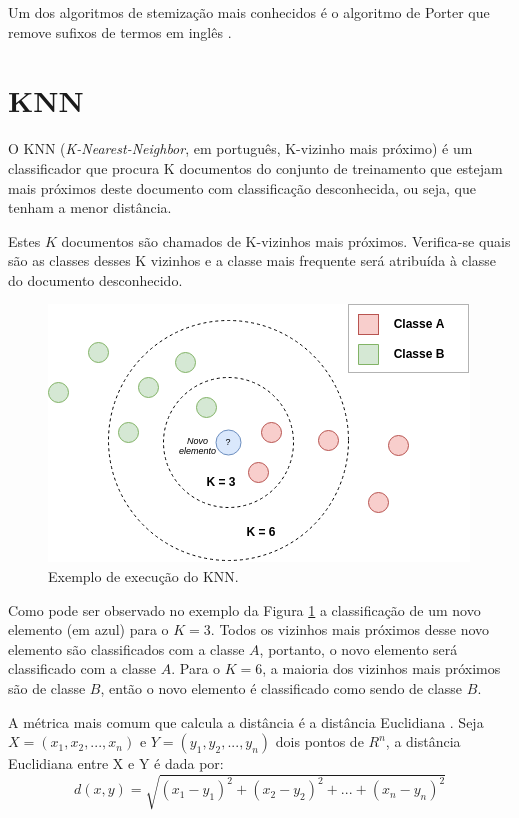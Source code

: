 Um dos algoritmos de stemização mais conhecidos é o algoritmo de Porter que remove sufixos de termos em inglês \cite{porter2001snowball}.

\section{KNN}\label{sec:knn}
O KNN ({\it K-Nearest-Neighbor}, em português, K-vizinho mais próximo) é um classificador que procura K documentos do conjunto de treinamento que estejam mais próximos deste documento com classificação desconhecida, ou seja, que tenham a menor distância.

Estes $K$ documentos são chamados de K-vizinhos mais próximos. Verifica-se quais são as classes desses K vizinhos e a classe mais frequente será atribuída à classe do documento desconhecido.

\begin{figure}[ht]
  \centering
  \includegraphics[height=0.2\textheight]{figuras/exemplos/exemplo-knn.png}
  \caption{Exemplo de execução do KNN.}
  \label{fig:exemplo-knn}
\end{figure}

Como pode ser observado no exemplo da Figura \ref{fig:exemplo-knn} a classificação de um novo elemento (em azul) para o $K=3$. Todos os vizinhos mais próximos desse novo elemento são classificados com a classe $A$, portanto, o novo elemento será classificado com a classe $A$. Para o $K=6$, a maioria dos vizinhos mais próximos são de classe $B$, então o novo elemento é classificado como sendo de classe $B$.

A métrica mais comum que calcula a distância é a distância Euclidiana \cite{santos2009variaccoes}. Seja $X=(x_1, x_2,..., x_n)$ e $Y=(y_1, y_2,..., y_n)$ dois pontos de $R^n$, a distância Euclidiana entre X e Y é dada por: 
\[d(x, y) = \sqrt{(x_1-y_1)^2+(x_2-y_2)^2+...+(x_n-y_n)^2}\]
